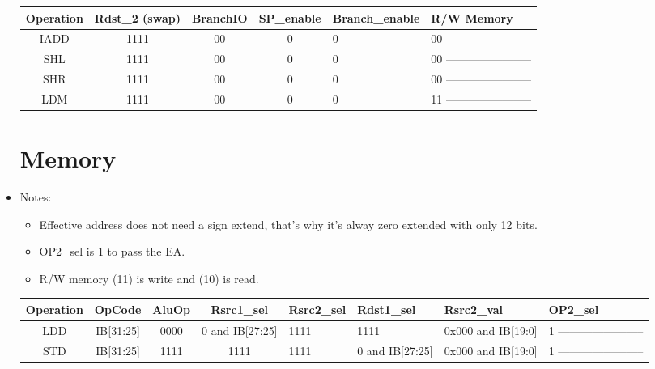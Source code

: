 \documentclass[12pt]{report}
\begin{document}
\begin{itemize}
\begin{center}
\begin{tabular}{||c| c| c| c| p{40mm}||}
        \end{tabular}
        \end{center}

        \begin{center}
        \begin{tabular}{||c| c| c| c| p{40mm}||} 
        \hline
        Operation & Rdst_2 (swap) & BranchIO & SP_enable & Branch_enable & R/W Memory  \\ [0.5ex] 
        \hline\hline
        IADD & 1111 & 00 & 0 & 0 & 00 ----------------------- \\
        \hline
        SHL & 1111 & 00 & 0 & 0 & 00 ----------------------- \\
        \hline
        SHR & 1111 & 00 & 0 & 0 & 00 ----------------------- \\
        \hline
        LDM & 1111 & 00 & 0 & 0 & 11 ----------------------- \\
        \hline

        \end{tabular}
        \end{center}



        \section{Memory}
        \item Notes:
        \begin{itemize}
            \item Effective address does not need a sign extend, that's why it's alway zero extended with only 12 bits.
            \item OP2_sel is 1 to pass the EA.
            \item R/W memory (11) is write and (10) is read.
        \end{itemize}

        \begin{center}
        \begin{tabular}{||c| c| c| c| p{40mm}||} 
        \hline
        Operation & OpCode & AluOp & Rsrc1_sel & Rsrc2_sel & Rdst1_sel & Rsrc2_val & OP2_sel  \\ [0.5ex] 
        \hline\hline
        LDD& IB[31:25] & 0000 & 0 and IB[27:25] & 1111 & 1111 & 0x000 and IB[19:0] & 1 ----------------------- \\
        \hline
        STD& IB[31:25] & 1111 & 1111 & 1111 & 0 and IB[27:25] & 0x000 and IB[19:0] & 1 ----------------------- \\
        \hline


\end{tabular}
\end{center}
\end{itemize}
\end{document}
